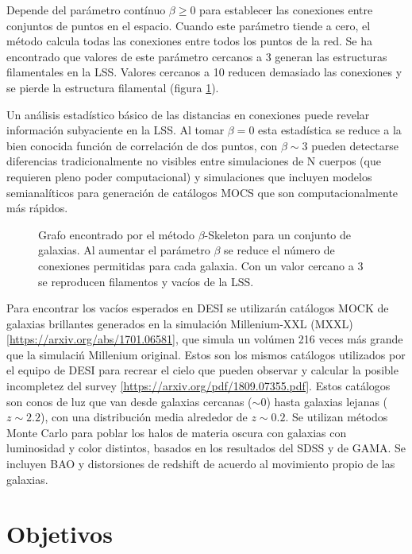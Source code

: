 \documentclass[preprint]{aastex62}
\begin{document}
  Depende del parámetro contínuo $\beta \geq 0$ para establecer las conexiones entre conjuntos de
  puntos en el espacio. Cuando este parámetro tiende a cero, el método calcula todas las conexiones
  entre todos los puntos de la red. Se ha encontrado que valores de este parámetro cercanos a 3
  generan las estructuras filamentales en la LSS. Valores cercanos a 10 reducen demasiado las
  conexiones y se pierde la estructura filamental (figura \ref{fig:beta_skeleton_analysis}). 

  Un análisis estadístico básico de las distancias en conexiones puede revelar información subyaciente
  en la LSS. Al tomar $\beta = 0$ esta estadística se reduce a la bien conocida función de correlación
  de dos puntos, con $\beta \sim 3$ pueden detectarse diferencias tradicionalmente no visibles entre
  simulaciones de N cuerpos (que requieren pleno poder computacional) y simulaciones que incluyen
  modelos semianalíticos para generación de catálogos MOCS que son computacionalmente más rápidos.

  \begin{figure}
    \caption{Grafo encontrado por el método $\beta$-Skeleton para un conjunto de galaxias. Al aumentar el
      parámetro $\beta$ se reduce el número de conexiones permitidas para cada galaxia. Con un valor cercano
      a 3 se reproducen filamentos y vacíos de la LSS.
      \citep{Fang2018} \label{fig:beta_skeleton_analysis}}
  \end{figure}


  

  Para encontrar los vacíos esperados en DESI se utilizarán catálogos MOCK de galaxias brillantes
  generados en la simulación Millenium-XXL (MXXL) \ref{https://arxiv.org/abs/1701.06581}, que simula un
  volúmen 216 veces más grande que la simulaciń Millenium original. Estos
  son los mismos catálogos utilizados por el equipo de DESI para recrear el cielo que pueden
  observar y calcular la posible incompletez del survey \ref{https://arxiv.org/pdf/1809.07355.pdf}.
  Estos catálogos son conos de luz que van
  desde galaxias cercanas ($\sim0$) hasta galaxias lejanas ($z\sim2.2$), con una distribución
  media alrededor de $z\sim 0.2$. Se utilizan métodos Monte Carlo para poblar los halos de materia
  oscura con galaxias con luminosidad y color distintos, basados en los resultados del SDSS y de
  GAMA. Se incluyen BAO y distorsiones de redshift de acuerdo al movimiento propio de las galaxias.

  
  \section{Objetivos}
\end{document}
